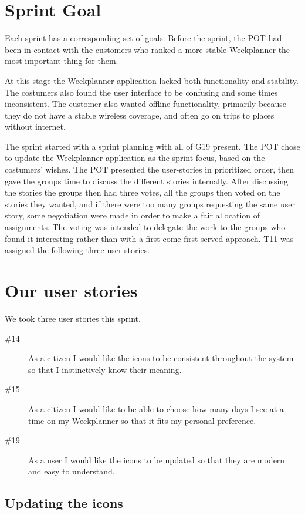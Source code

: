 \section{Sprint Goal}

Each sprint has a corresponding set of goals. Before the sprint, the \gls{POT} had been in contact with the customers who ranked a more stable Weekplanner the most important thing for them.

At this stage the Weekplanner application lacked both functionality and stability. The costumers also found the user interface to be confusing and some times inconsistent. The customer also wanted offline functionality, primarily because they do not have a stable wireless coverage, and often go on trips to places without internet.

The sprint started with a sprint planning with all of \gls{G19} present. The \gls{POT} chose to update the Weekplanner application as the sprint focus, based on the costumers' wishes. The \gls{POT} presented the user-stories in prioritized order, then gave the groups time to discuss the different stories internally. After discussing the stories the groups then had three votes, all the groups then voted on the stories they wanted, and if there were too many groups requesting the same user story, some negotiation were made in order to make a fair allocation of assignments. The voting was intended to delegate the work to the groups who found it interesting rather than with a first come first served approach. \gls{T11} was assigned the following three user stories.

\section{Our user stories}
We took three user stories this sprint.
\begin{description}
    \item [\#14] As a citizen I would like the icons to be consistent throughout the system so that I instinctively know their meaning.
    \item [\#15] As a citizen I would like to be able to choose how many days I see at a time on my Weekplanner so that it fits my personal preference.
    \item [\#19] As a user I would like the icons to be updated so that they are modern and easy to understand.
\end{description}

\subsection{Updating the icons}

